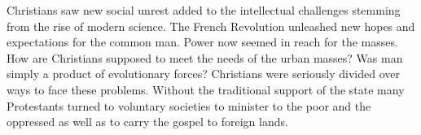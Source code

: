 
\begin{partsummary}
Christians saw new social unrest added to the intellectual challenges stemming from the rise of
modern science. The French Revolution unleashed new hopes and expectations for the common man. Power
now seemed in reach for the masses. How are Christians supposed to meet the needs of the urban
masses? Was man simply a product of evolutionary forces? Christians were seriously divided over ways
to face these problems. Without the traditional support of the state many Protestants turned to
voluntary societies to minister to the poor and the oppressed as well as to carry the gospel to
foreign lands.
\end{partsummary}


